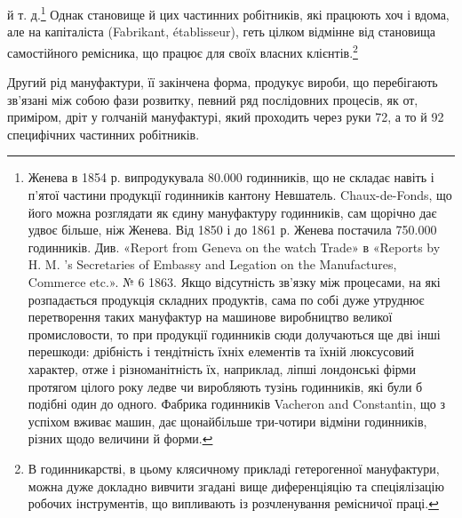 й т. д.\footnote{
Женева в 1854 р. випродукувала 80.000 годинників, що не складає
навіть і п’ятої частини продукції годинників кантону Невшатель.
Chaux-de-Fonds, що його можна розглядати як єдину мануфактуру годинників,
сам щорічно дає удвоє більше, ніж Женева. Від 1850 і до 1861 р.
Женева постачила 750.000 годинників. Див. «Report from Geneva on
the watch Trade» в «Reports by H. M. ’s Secretaries of Embassy and Legation
on the Manufactures, Commerce etc.». № 6 1863. Якщо відсутність
зв’язку між процесами, на які розпадається продукція складних продуктів, сама по собі дуже утруднює перетворення таких мануфактур на
машинове виробництво великої промисловости, то при продукції годинників
сюди долучаються ще дві інші перешкоди: дрібність і тендітність
їхніх елементів та їхній люксусовий характер, отже і різноманітність їх,
наприклад, ліпші лондонські фірми протягом цілого року ледве чи виробляють
тузінь годинників, які були б подібні один до одного. Фабрика
годинників Vacheron and Constantin, що з успіхом вживає машин,
дає щонайбільше три-чотири відміни годинників, різних щодо величини
й форми.
} Однак становище й цих частинних робітників, які працюють
хоч і вдома, але на капіталіста (Fabrikant, établisseur),
геть цілком відмінне від становища самостійного ремісника, що
працює для своїх власних клієнтів.\footnote{
В годинникарстві, в цьому клясичному прикладі гетерогенної
мануфактури, можна дуже докладно вивчити згадані вище диференціяцію
та спеціялізацію робочих інструментів, що випливають із розчленування
ремісничої праці.
}

Другий рід мануфактури, її закінчена форма, продукує
вироби, що перебігають зв’язані між собою фази розвитку, певний
ряд послідовних процесів, як от, приміром, дріт у голчаній
мануфактурі, який проходить через руки 72, а то й 92 специфічних
частинних робітників.

